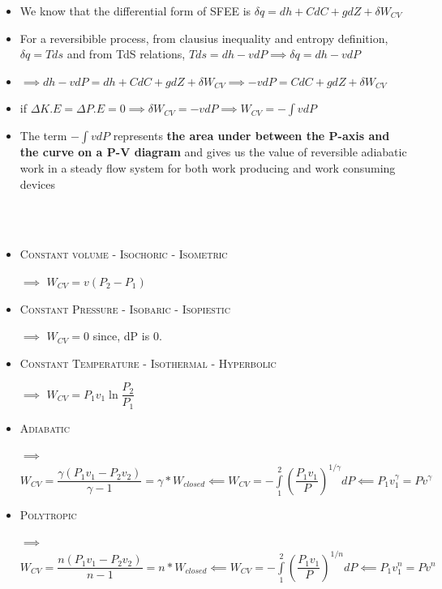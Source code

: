 \documentclass[8pt]{article}
\begin{document}
	\begin{itemize}
		\item We know that the differential form of SFEE is $\boxed{\delta q = dh + CdC + gdZ + \delta W_{CV}}$
		\item For a reversibible process, from clausius inequality and entropy definition, $\delta q = Tds$ and from TdS relations, $Tds = dh - vdP \implies \delta q = dh - vdP$
		\item $\implies dh-vdP = dh + CdC + gdZ + \delta W_{CV} \implies -vdP = CdC + gdZ + \delta W_{CV}$
		\item if $\Delta K.E = \Delta P.E = 0 \implies \delta W_{CV} = -vdP \implies W_{CV} = -\int vdP$
		\item The term $-\int vdP$ represents \textbf{the area under between the P-axis and the curve on a P-V diagram} and gives us the value of reversible adiabatic work in a steady flow system for both work producing and work consuming devices
	\end{itemize}\hrulefill\\\\
	\begin{itemize}
	\item \textsc{Constant volume - Isochoric - Isometric}
		\item[$\implies$] $\boxed{W_{CV} = v(P_2-P_1)}$
	\item \textsc{Constant Pressure - Isobaric - Isopiestic}
		\item[$\implies$] $\boxed{W_{CV} = 0}$ since, dP is 0. 
	\item \textsc{Constant Temperature - Isothermal - Hyperbolic}
		\item[$\implies$] $\boxed{W_{CV} = P_1v_1\ln\dfrac{P_2}{P_1}}$
	\item \textsc{Adiabatic} 
		\item[$\implies$] $\boxed{W_{CV} = \dfrac{\gamma\left(P_1v_1-P_2v_2\right)}{\gamma -1}} = \gamma *W_{closed} \impliedby W_{CV} = -\int\limits_1^2\left(\dfrac{P_1v_1}{P}\right)^{1/\gamma}dP \impliedby \boxed{P_1v_1^\gamma = Pv^\gamma}$ 
	\item \textsc{Polytropic} 
		\item[$\implies$] $\boxed{W_{CV} = \dfrac{n\left(P_1v_1-P_2v_2\right)}{n-1}} = n*W_{closed} \impliedby W_{CV} = -\int\limits_1^2\left(\dfrac{P_1v_1}{P}\right)^{1/n}dP \impliedby \boxed{P_1v_1^n = Pv^n}$ 
	\end{itemize}\hrulefill\\\\
\end{document}
